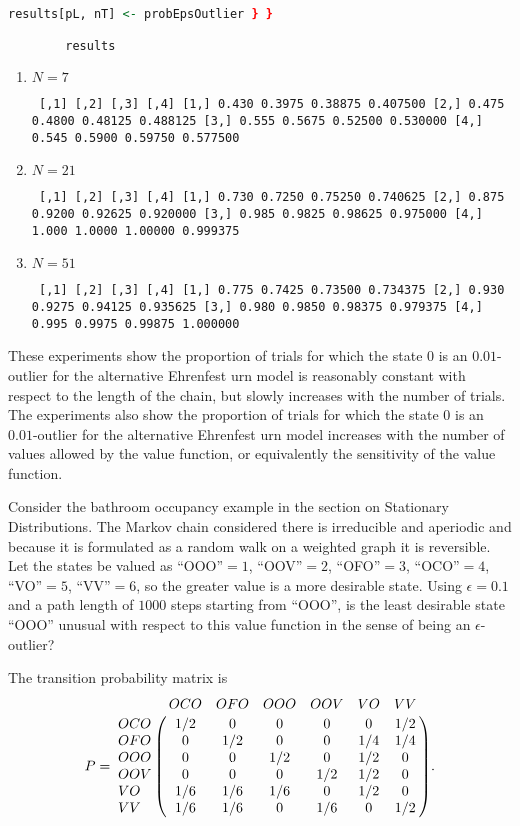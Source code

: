 \documentclass[12pt]{article}
\begin{document}
\begin{solution}
\begin{lstlisting}[language=R]
        results[pL, nT] <- probEpsOutlier } }

        results
    \end{lstlisting}

    \begin{enumerate}
    \item
      \( N= 7 \)
      
\texttt{
        [,1]   [,2]    [,3]     [,4]
[1,] 0.430 0.3975 0.38875 0.407500
[2,] 0.475 0.4800 0.48125 0.488125
[3,] 0.555 0.5675 0.52500 0.530000
[4,] 0.545 0.5900 0.59750 0.577500
}
\item

  \( N = 21 \)
  
\texttt{
      [,1]   [,2]    [,3]     [,4]
[1,] 0.730 0.7250 0.75250 0.740625
[2,] 0.875 0.9200 0.92625 0.920000
[3,] 0.985 0.9825 0.98625 0.975000
[4,] 1.000 1.0000 1.00000 0.999375
}
\item
  \( N = 51 \)
  
\texttt{
      [,1]   [,2]    [,3]     [,4]
[1,] 0.775 0.7425 0.73500 0.734375
[2,] 0.930 0.9275 0.94125 0.935625
[3,] 0.980 0.9850 0.98375 0.979375
[4,] 0.995 0.9975 0.99875 1.000000
}
    \end{enumerate}

These experiments show the proportion of trials for which the state \( 0
\) is an \( 0.01 \)-outlier for the alternative Ehrenfest urn model is
reasonably constant with respect to the length of the chain, but slowly
increases with the number of trials.  The experiments also show the
proportion of trials for which the state \( 0 \) is an \( 0.01 \)-outlier
for the alternative Ehrenfest urn model increases with the number of
values allowed by the value function, or equivalently the sensitivity of
the value function.
\end{solution}

\begin{exercise}
    Consider the bathroom occupancy example in the section on Stationary
    Distributions.  The Markov chain considered there is irreducible and
    aperiodic and because it is formulated as a random walk on a
    weighted graph it is reversible.  Let the states be valued as
    ``OOO''\( =1 \), ``OOV''\( =2 \), ``OFO''\( =3 \), ``OCO''\( =4 \),
    ``VO''\( =5 \), ``VV''\( =6 \), so the greater value is a more
    desirable state.  Using \( \epsilon=0.1 \) and a path length of \(
    1000 \) steps starting from ``OOO'', is the least desirable state
    ``OOO'' unusual with respect to this value function in the sense of
    being an \( \epsilon \)-outlier?

    The transition probability matrix is
    \[
        P= \bordermatrix{ & OCO & OFO & OOO & OOV & VO & VV \cr
        OCO & 1/2 & 0 & 0 & 0 & 0 & 1/2 \cr
        OFO & 0 & 1/2 & 0 & 0 & 1/4 & 1/4 \cr
        OOO & 0 & 0 & 1/2 & 0 & 1/2 & 0 \cr
        OOV & 0 & 0 & 0 & 1/2 & 1/2 & 0 \cr
        VO & 1/6 & 1/6 & 1/6 & 0 & 1/2 & 0 \cr
        VV & 1/6 & 1/6 & 0 & 1/6 & 0 & 1/2 \cr
        }.
    \]
\end{exercise}
\end{document}
